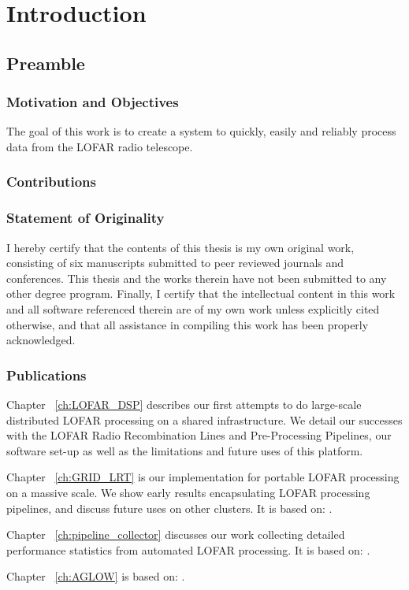 \chapter{Introduction}


\section{Preamble}

\subsection{Motivation and Objectives}

The goal of this work is to create a system to quickly, easily and reliably process data from the LOFAR radio telescope. 




\subsection{Contributions}




\subsection{Statement of Originality}

I hereby certify that the contents of this thesis is my own original work, consisting of six manuscripts submitted to peer reviewed journals and conferences. This thesis and the works therein have not been submitted to any other degree program. Finally, I certify that the intellectual content in this work and all software referenced therein are of my own work unless explicitly cited otherwise, and that all assistance in compiling this work has been properly acknowledged.

\subsection{Publications}

Chapter ~\ref{ch:LOFAR_DSP} describes our first attempts to do large-scale distributed LOFAR processing on a shared infrastructure. We detail our successes with the LOFAR Radio Recombination Lines and Pre-Processing Pipelines, our software set-up as well as the limitations and future uses of this platform.  


Chapter ~\ref{ch:GRID_LRT} is our implementation for portable LOFAR processing on a massive scale. We show early results encapsulating LOFAR processing pipelines, and discuss future uses on other clusters. It is based on:  .

Chapter ~\ref{ch:pipeline_collector} discusses our work collecting detailed performance statistics from automated LOFAR processing. It is based on: .

Chapter ~\ref{ch:AGLOW} is based on: .

